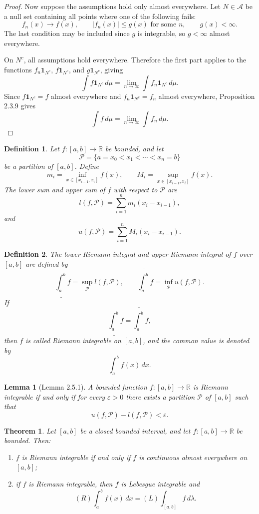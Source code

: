 \documentclass[12pt]{article}
\newtheorem{theorem}{Theorem}
\newtheorem{lemma}{Lemma}
\newtheorem{definition}{Definition}
\begin{document}
\begin{proof}
Now suppose the assumptions hold only almost everywhere. Let $N\in\mathcal{A}$
be a null set containing all points where one of the following fails:
\[
f_n(x)\to f(x), \qquad |f_n(x)|\le g(x)\text{ for some }n, \qquad g(x)<\infty.
\]
The last condition may be included since $g$ is integrable, so $g<\infty$
almost everywhere.

On $N^c$, all assumptions hold everywhere. Therefore the first part applies to
the functions $f_n\mathbf{1}_{N^c}$, $f\mathbf{1}_{N^c}$, and
$g\mathbf{1}_{N^c}$, giving
\[
\int f\mathbf{1}_{N^c}\,d\mu
=
\lim_{n\to\infty}\int f_n\mathbf{1}_{N^c}\,d\mu.
\]
Since $f\mathbf{1}_{N^c}=f$ almost everywhere and
$f_n\mathbf{1}_{N^c}=f_n$ almost everywhere, Proposition 2.3.9 gives
\[
\int f\,d\mu
=
\lim_{n\to\infty}\int f_n\,d\mu.
\]

\end{proof}

\begin{definition}
Let $f:[a,b]\to\mathbb{R}$ be bounded, and let
\[
\mathcal{P}=\{a=x_0<x_1<\cdots<x_n=b\}
\]
be a partition of $[a,b]$. Define
\[
m_i=\inf_{x\in[x_{i-1},x_i]} f(x),
\qquad
M_i=\sup_{x\in[x_{i-1},x_i]} f(x).
\]
The \emph{lower sum} and \emph{upper sum} of $f$ with respect to $\mathcal{P}$
are
\[
l(f,\mathcal{P})
=
\sum_{i=1}^n m_i(x_i-x_{i-1}),
\]
and
\[
u(f,\mathcal{P})
=
\sum_{i=1}^n M_i(x_i-x_{i-1}).
\]
\end{definition}

\begin{definition}
The \emph{lower Riemann integral} and \emph{upper Riemann integral} of $f$ over
$[a,b]$ are defined by
\[
\underline{\int_a^b} f
=
\sup_{\mathcal{P}} l(f,\mathcal{P}),
\qquad
\overline{\int_a^b} f
=
\inf_{\mathcal{P}} u(f,\mathcal{P}).
\]
If
\[
\underline{\int_a^b} f
=
\overline{\int_a^b} f,
\]
then $f$ is called \emph{Riemann integrable} on $[a,b]$, and the common value is
denoted by
\[
\int_a^b f(x)\,dx.
\]
\end{definition}

\begin{lemma}[Lemma 2.5.1]
A bounded function $f:[a,b]\to\mathbb{R}$ is Riemann integrable if and only if
for every $\varepsilon>0$ there exists a partition $\mathcal{P}$ of $[a,b]$ such
that
\[
u(f,\mathcal{P})-l(f,\mathcal{P})<\varepsilon.
\]
\end{lemma}

\begin{theorem}
Let $[a,b]$ be a closed bounded interval, and let
$f:[a,b]\to\mathbb{R}$ be bounded. Then:
\begin{enumerate}[label=(\alph*)]
    \item $f$ is Riemann integrable if and only if $f$ is continuous almost
    everywhere on $[a,b]$;
    \item if $f$ is Riemann integrable, then $f$ is Lebesgue integrable and
    \[
    (R)\int_a^b f(x)\,dx
    =
    (L)\int_{[a,b]} f\,d\lambda.
    \]
\end{enumerate}
\end{theorem}
\end{document}
